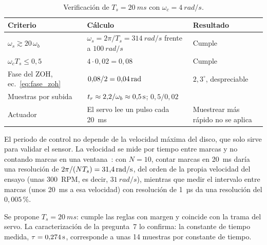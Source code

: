 \begin{table}[h]
\centering\small
\caption{Verificación de $T_s=\SI{20}{ms}$ con $\omega_c=\SI{4}{rad/s}$.}
\label{tab:ts}
\begin{tabularx}{\linewidth}{@{}>{\raggedright\arraybackslash}p{4cm}>{\raggedright\arraybackslash}X>{\raggedright\arraybackslash}p{3.4cm}@{}}
\toprule
Criterio & Cálculo & Resultado \\
\midrule
$\omega_s \gtrsim 20\,\omega_b$ & $\omega_s=2\pi/T_s=\SI{314}{rad/s}$ frente a $\SI{100}{rad/s}$ & Cumple \\
$\omega_c T_s \leq 0{,}5$ & $4\cdot 0{,}02 = 0{,}08$ & Cumple \\
Fase del ZOH, ec.~\eqref{eq:fase_zoh} & $0{,}08/2=0{,}04\,\mathrm{rad}$ & $2{,}3^\circ$, despreciable \\
Muestras por subida & $t_r\approx 2{,}2/\omega_b\approx0{,}5\,\mathrm{s}$; $0{,}5/0{,}02$ & 25 \\
Actuador & El servo lee un pulso cada 20~ms~\cite{mg90s} & Muestrear más rápido no se aplica \\
\bottomrule
\end{tabularx}
\end{table}

El periodo de control no depende de la velocidad máxima del disco, que solo sirve para validar el
sensor. La velocidad se mide por tiempo entre marcas y no contando marcas en una
ventana~\cite{petrella2007speed}: con $N=10$, contar marcas en 20~ms daría una resolución de
$2\pi/(N T_s)=31{,}4\,\mathrm{rad/s}$, del orden de la propia velocidad del ensayo (unas 300~RPM, es
decir, $\SI{31}{rad/s}$), mientras que medir el intervalo entre marcas (unos 20~ms a esa
velocidad) con resolución de 1~µs da una resolución del $0{,}005\,\%$.

Se propone $T_s=\SI{20}{ms}$: cumple las reglas con margen y coincide con la trama del servo. La
caracterización de la pregunta~7 lo confirma: la constante de tiempo medida, $\tau=0{,}274\,\mathrm{s}$,
corresponde a unas 14 muestras por constante de tiempo.
